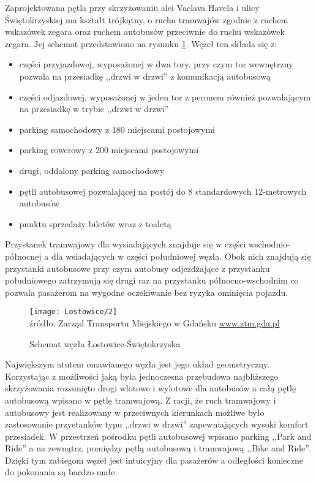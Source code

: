 \documentclass[twoside,12pt]{article}
\begin{document}
	Zaprojektowana pętla przy skrzyżowaniu alei Vaclava Havela i ulicy Świętokrzyskiej ma kształt trójkątny, o ruchu tramwajów zgodnie z ruchem wskazówek zegara oraz ruchem autobusów przeciwnie do ruchu wskazówek zegara. Jej schemat przedstawiono na rysunku \ref{lostowice3}. Węzeł ten składa się z:
	\begin{itemize}\setlength{\itemsep}{0em}
	\item części przyjazdowej, wyposażonej w dwa tory, przy czym tor wewnętrzny pozwala na przesiadkę ,,drzwi w drzwi'' z komunikacją autobusową
	\item części odjazdowej, wyposażonej w jeden tor z peronem również pozwalającym  na przesiadkę w trybie ,,drzwi w drzwi''
	\item parking samochodowy z 180 miejscami postojowymi
	\item parking rowerowy z 200 miejscami postojowymi
	\item drugi, oddalony parking samochodowy
	\item pętli autobusowej pozwalającej na postój do 8 standardowych 12-metrowych autobusów
	\item punktu sprzedaży biletów wraz z toaletą
	\end{itemize}
	
	Przystanek tramwajowy dla wysiadających znajduje się w części wschodnio-północnej a dla wsiadających w części południowej węzła. Obok nich znajdują się przystanki autobusowe przy czym autobusy odjeżdżające z przystanku południowego zatrzymują się drugi raz na przystanku północno-wschodnim co pozwala pasażerom na wygodne oczekiwanie bez ryzyka ominięcia pojazdu. 
	
	\begin{figure}[H]
		\centering
		\caption{Schemat węzła Łostowice-Świętokrzyska}
		\texttt{[image: Lostowice/2]}\\
		\footnotesize{źródło: Zarząd Transportu Miejskiego w Gdańsku \url{www.ztm.gda.pl}}
		\label{lostowice3}
	\end{figure}
	
	Największym atutem omawianego węzła jest jego układ geometryczny. Korzystając z możliwości jaką była jednoczesna przebudowa najbliższego skrzyżowania rozsunięto drogi wlotowe i wylotowe dla autobusów a całą pętlę autobusową wpisano w pętlę tramwajową. Z racji, że ruch tramwajowy i autobusowy jest realizowany w przeciwnych kierunkach możliwe było zastosowanie przystanków typu ,,drzwi w drzwi'' zapewniających wysoki komfort przesiadek. W przestrzeń pośrodku pętli autobusowej wpisano parking ,,Park and Ride'' a na zewnątrz, pomiędzy pętlą autobusową i tramwajową ,,Bike and Ride''. Dzięki tym zabiegom węzeł jest intuicyjny dla pasażerów a odległości konieczne do pokonania są bardzo małe. 
	
\end{document}
